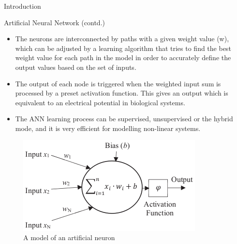 \documentclass{beamer}
\begin{document}
\begin{frame}{Introduction}
    \vspace{-1mm}
    \begin{block}{Artificial Neural Network (contd.)}
    \begin{itemize}
    \justifying
        \item The neurons are interconnected by paths with a given weight value (w), which can be adjusted by a learning algorithm that tries to find the best weight value for each path in the model in order to accurately define the output values based on the set of inputs.\vspace{-1mm}
        \item The output of each node is triggered when the weighted input sum is processed by a preset activation function. This gives an output which is equivalent to an electrical potential in biological systems.\vspace{-1mm}
        \item The ANN learning process can be supervised, unsupervised or the hybrid mode, and it is very efficient for modelling non-linear systems.
    \end{itemize}\vspace{-3mm}
    \begin{figure}
        \centering
        \includegraphics[width=0.35\columnwidth]{Figures/ANN-node.png}\vspace{-1mm}
        \caption{A model of an artificial neuron}
        \label{ANN-node}
    \end{figure}\vspace{-6mm}
    \end{block}
\end{frame}
\end{document}
